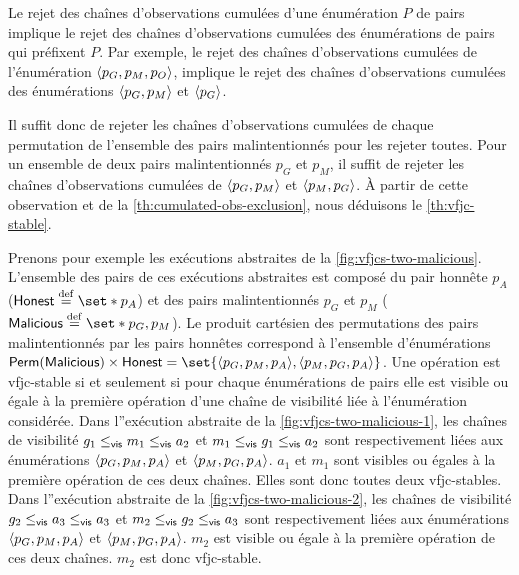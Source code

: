 Le rejet des chaînes d'observations cumulées d'une énumération $P$ de pairs implique le rejet des chaînes d'observations cumulées des énumérations de pairs qui préfixent $P$.
Par exemple, le rejet des chaînes d'observations cumulées de l'énumération $\tuple*{p_G, p_M, p_O}$, implique le rejet des chaînes d'observations cumulées des énumérations $\tuple*{p_G, p_M}$ et $\tuple*{p_G}$.

Il suffit donc de rejeter les chaînes d'observations cumulées de chaque permutation de l'ensemble des pairs malintentionnés pour les rejeter toutes.
Pour un ensemble de deux pairs malintentionnés $p_G$ et $p_M$, il suffit de rejeter les chaînes d'observations cumulées de $\tuple*{p_G, p_M}$ et $\tuple*{p_M, p_G}$.
À partir de cette observation et de la \autoref{th:cumulated-obs-exclusion}, nous déduisons le \autoref{th:vfjc-stable}.

Prenons pour exemple les exécutions abstraites de la \autoref{fig:vfjcs-two-malicious}.
L'ensemble des pairs de ces exécutions abstraites est composé du pair honnête $p_A$ ($\trm{Honest} \defeq \set*{p_A}$) et des pairs malintentionnés $p_G$ et $p_M$ ($\trm{Malicious} \defeq \set*{p_G, p_M}$).
Le produit cartésien des permutations des pairs malintentionnés par les pairs honnêtes correspond à l'ensemble d'énumérations $\trm{Perm}(\trm{Malicious}) \times \trm{Honest} = \set{\tuple*{p_G, p_M, p_A}, \tuple*{p_M, p_G, p_A}}$.
Une opération est vfjc-stable si et seulement si pour chaque énumérations de pairs elle est visible ou égale à la première opération d'une chaîne de visibilité liée à l'énumération considérée.
Dans l''exécution abstraite de la \autoref{fig:vfjcs-two-malicious-1}, les chaînes de visibilité $g_1 \viseq m_1 \viseq a_2$ et $m_1 \viseq g_1 \viseq a_2$ sont respectivement liées aux énumérations $\tuple*{p_G, p_M, p_A}$ et $\tuple*{p_M, p_G, p_A}$.
$a_1$ et $m_1$ sont visibles ou égales à la première opération de ces deux chaînes.
Elles sont donc toutes deux vfjc-stables.
Dans l''exécution abstraite de la \autoref{fig:vfjcs-two-malicious-2}, les chaînes de visibilité $g_2 \viseq a_3 \viseq a_3$ et $m_2 \viseq g_2 \viseq a_3$ sont respectivement liées aux énumérations $\tuple*{p_G, p_M, p_A}$ et $\tuple*{p_M, p_G, p_A}$.
$m_2$ est visible ou égale à la première opération de ces deux chaînes.
$m_2$ est donc vfjc-stable.

